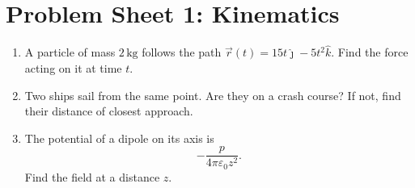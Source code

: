 \documentclass[12pt]{article}
\begin{document}
\section*{Problem Sheet 1: Kinematics}

\begin{enumerate}

\item A particle of mass $2\,\mathrm{kg}$ follows the path
  $\vec{r}(t) = 15 t \hat{\jmath} - 5 t^2 \hat{k}$. Find the force acting on
  it at time $t$.

\item Two ships sail from the same point. Are they on a crash course? If not,
  find their distance of closest approach.

\item The potential of a dipole on its axis is
  \[
  -\frac{p}{4 \pi \varepsilon_0 z^2}.
  \]
  Find the field at a distance $z$.

\end{enumerate}
\end{document}
